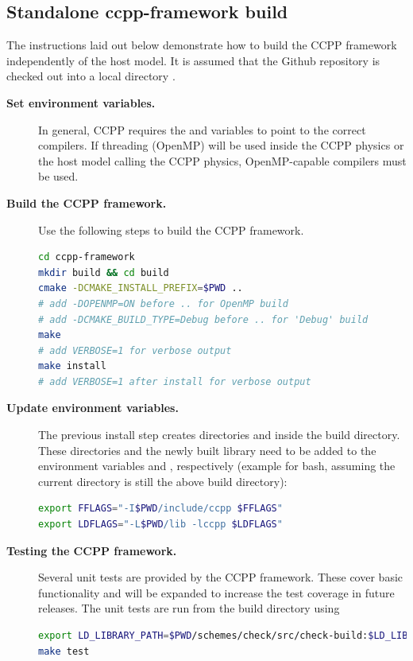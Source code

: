 \subsection{Standalone ccpp-framework build}\label{sec_ccpp_framework_standalone_build}
The instructions laid out below demonstrate how to build the CCPP framework independently of the host model. It is assumed that the Github repository is checked out into a local directory .
\begin{description}
\item[\textbf{Set environment variables.}] In general, CCPP requires the  and  variables to point to the correct compilers. If threading (OpenMP) will be used inside the CCPP physics or the host model calling the CCPP physics, OpenMP-capable compilers must be used.
\item[\textbf{Build the CCPP framework.}] Use the following steps to build the CCPP framework.
\begin{lstlisting}[language=bash]
cd ccpp-framework
mkdir build && cd build
cmake -DCMAKE_INSTALL_PREFIX=$PWD ..
# add -DOPENMP=ON before .. for OpenMP build
# add -DCMAKE_BUILD_TYPE=Debug before .. for 'Debug' build
make
# add VERBOSE=1 for verbose output
make install
# add VERBOSE=1 after install for verbose output
\end{lstlisting}
\item[\textbf{Update environment variables.}] The previous install step creates directories  and  inside the build directory. These directories and the newly built library  need to be added to the environment variables  and , respectively (example for bash, assuming the current directory is still the above build directory):
\begin{lstlisting}[language=bash]
export FFLAGS="-I$PWD/include/ccpp $FFLAGS"
export LDFLAGS="-L$PWD/lib -lccpp $LDFLAGS"
\end{lstlisting}
\item[\textbf{Testing the CCPP framework.}] Several unit tests are provided by the CCPP framework. These cover basic functionality and will be expanded to increase the test coverage in future releases. The unit tests are run from the build directory using
\begin{lstlisting}[language=bash]
export LD_LIBRARY_PATH=$PWD/schemes/check/src/check-build:$LD_LIBRARY_PATH
make test
\end{lstlisting}
\end{description}
